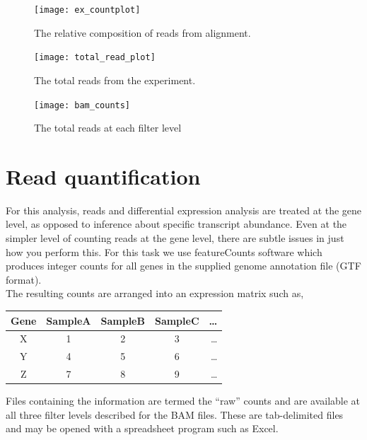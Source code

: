 \documentclass{article}
\begin{document}
{\begin{figure}[ht!]
  \centering
    \texttt{[image: ex\_countplot]}
    \caption{The relative composition of reads from alignment.}
    \label{fig:relative_composition}
\end{figure}

\begin{figure}[ht!]
  \centering
    \texttt{[image: total\_read\_plot]}
    \caption{The total reads from the experiment.}
     \label{fig:total_counts}
\end{figure}

\begin{figure}[ht!]
  \centering
    \texttt{[image: bam\_counts]}
    \caption{The total reads at each filter level}
     \label{fig:bam_level_counts}
\end{figure}

{%

\section{Read quantification}

For this analysis, reads and differential expression analysis are treated at the gene level, as opposed to inference about specific transcript abundance.  Even at the simpler level of counting reads at the gene level, there are subtle issues in just how you perform this.  For this task we use featureCounts software \cite{featureCounts} which produces integer counts for all genes in the supplied genome annotation file (GTF format).  \\

The resulting counts are arranged into an expression matrix such as,
\begin{center}
\begin{tabular}{c || c | c | c | r }
  Gene & SampleA & SampleB & SampleC & \ldots \\
  \hline			
  X & 1 & 2 & 3 & \ldots \\
  Y & 4 & 5 & 6 & \ldots\\
  Z & 7 & 8 & 9 & \ldots\\
  \hline  
\end{tabular}
\end{center}

Files containing the information are termed the ``raw'' counts and are available at all three filter levels described for the BAM files.  These are tab-delimited files and may be opened with a spreadsheet program such as Excel.


}}
\end{document}
